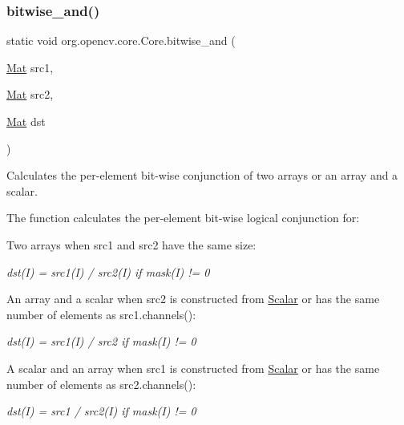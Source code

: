 \subsubsection{\texorpdfstring{bitwise\+\_\+and()}{bitwise\_and()}\hspace{0.1cm}{\footnotesize\ttfamily [2/2]}}
{\footnotesize\ttfamily static void org.\+opencv.\+core.\+Core.\+bitwise\+\_\+and (\begin{DoxyParamCaption}\item[{\mbox{\hyperlink{classorg_1_1opencv_1_1core_1_1_mat}{Mat}}}]{src1,  }\item[{\mbox{\hyperlink{classorg_1_1opencv_1_1core_1_1_mat}{Mat}}}]{src2,  }\item[{\mbox{\hyperlink{classorg_1_1opencv_1_1core_1_1_mat}{Mat}}}]{dst }\end{DoxyParamCaption})\hspace{0.3cm}{\ttfamily [static]}}

Calculates the per-\/element bit-\/wise conjunction of two arrays or an array and a scalar.

The function calculates the per-\/element bit-\/wise logical conjunction for\+:


\begin{DoxyItemize}
\item Two arrays when {\ttfamily src1} and {\ttfamily src2} have the same size\+: 
\end{DoxyItemize}

{\itshape dst(\+I) = src1(\+I) / src2(\+I) if mask(\+I) != 0}


\begin{DoxyItemize}
\item An array and a scalar when {\ttfamily src2} is constructed from {\ttfamily \mbox{\hyperlink{classorg_1_1opencv_1_1core_1_1_scalar}{Scalar}}} or has the same number of elements as {\ttfamily src1.\+channels()}\+: 
\end{DoxyItemize}

{\itshape dst(\+I) = src1(\+I) / src2 if mask(\+I) != 0}


\begin{DoxyItemize}
\item A scalar and an array when {\ttfamily src1} is constructed from {\ttfamily \mbox{\hyperlink{classorg_1_1opencv_1_1core_1_1_scalar}{Scalar}}} or has the same number of elements as {\ttfamily src2.\+channels()}\+: 
\end{DoxyItemize}

{\itshape dst(\+I) = src1 / src2(\+I) if mask(\+I) != 0}

